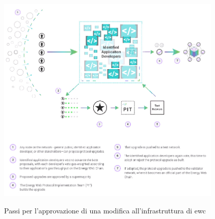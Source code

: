 \documentclass[12pt, letterpaper, twoside]{article}
\begin{document}
\begin{figure}[!h]
    \includegraphics[height=10cm,keepaspectratio]{ew-governance}
    \centering
    \label{ew-governance}
    \caption{Passi per l'approvazione di una modifica all'infrastruttura di \gls{ewc} \cite{img:ew-governance}}
\end{figure}
 
\newpage
 
\printbibliography
\end{document}
